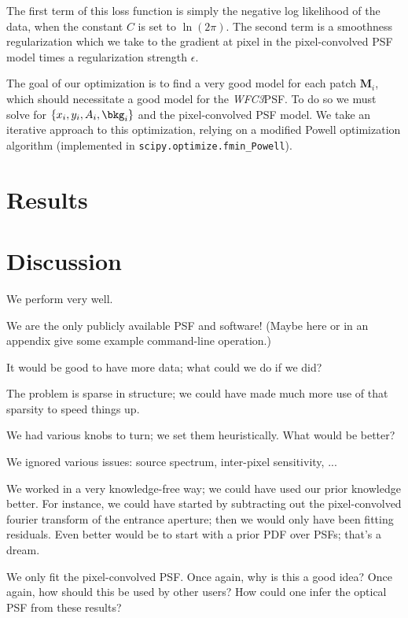 \documentclass[12pt,letterpaper,preprint]{aastex}
\newcommand{\instrument}[1]{\textsl{#1}}
\newcommand{\vect}[1]{\mathbf{#1}}
\newcommand{\WFC}{\instrument{WFC3}}
\newcommand{\model}{\vect{M}}
\begin{document}
\noindent The first term of this loss function is simply the negative log likelihood of the data, 
when the constant $C$ is set to $\ln(2\pi)$.  The second term is a smoothness regularization which 
we take to the gradient at pixel in the pixel-convolved PSF model times a regularization 
strength $\epsilon$.

The goal of our optimization is to find a very good model for each patch $\model_i$, which should 
necessitate a good model for the \WFC PSF.  To do so we must solve for $\{x_i, y_i, A_i, \bkg_i\}$ 
and the pixel-convolved PSF model.  We take an iterative approach to this optimization, relying on  
a modified Powell optimization algorithm (implemented in \texttt{scipy.optimize.fmin_Powell}). 

\section{Results}

\section{Discussion}

We perform very well.

We are the only publicly available PSF and software!
(Maybe here or in an appendix give some example command-line operation.)

It would be good to have more data;
  what could we do if we did?

The problem is sparse in structure;
  we could have made much more use of that sparsity to speed things up.

We had various knobs to turn; we set them heuristically.
What would be better?

We ignored various issues: source spectrum, inter-pixel sensitivity, ...

We worked in a very knowledge-free way;
  we could have used our prior knowledge better.
For instance, we could have started by subtracting out the pixel-convolved fourier transform of the entrance aperture;
  then we would only have been fitting residuals.
Even better would be to start with a prior PDF over PSFs;
  that's a dream.

We only fit the pixel-convolved PSF.
Once again, why is this a good idea?
Once again, how should this be used by other users?
How could one infer the optical PSF from these results?
\end{document}

